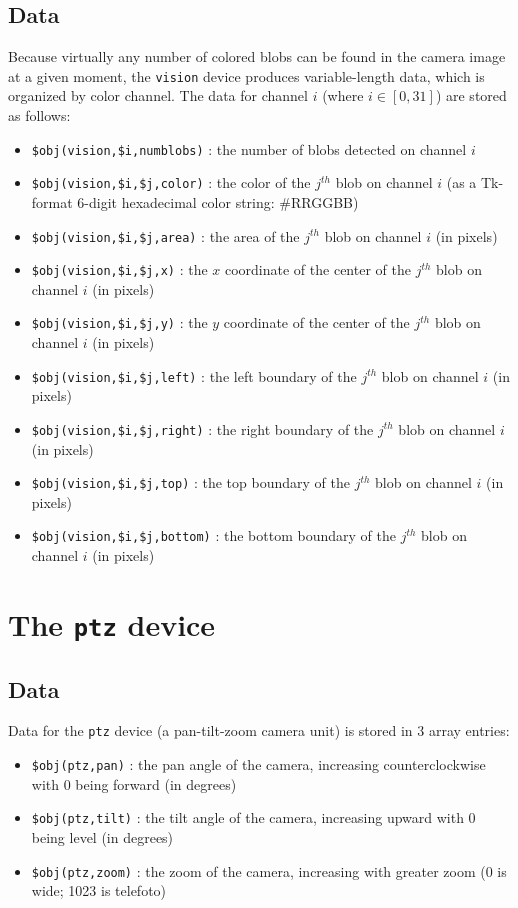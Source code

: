 \documentclass[11pt]{article}
\begin{document}
\subsection{Data}
Because virtually any number of colored blobs can be found in the camera image 
at a given moment, the {\tt vision} device produces variable-length data,
which is organized by color channel.  The data for channel $i$ (where 
$i \in [0,31]$) are stored as follows:
\begin{itemize}
\item {\tt \$obj(vision,\$i,numblobs)} : the number of blobs detected on
channel $i$
\item {\tt \$obj(vision,\$i,\$j,color)} : the color of the $j^{th}$ blob on
channel $i$ (as a Tk-format 6-digit hexadecimal color string: \#RRGGBB)
\item {\tt \$obj(vision,\$i,\$j,area)} : the area of the $j^{th}$ blob on
channel $i$ (in pixels)
\item {\tt \$obj(vision,\$i,\$j,x)} : the $x$ coordinate of the center of the 
$j^{th}$ blob on channel $i$ (in pixels)
\item {\tt \$obj(vision,\$i,\$j,y)} : the $y$ coordinate of the center of the 
$j^{th}$ blob on channel $i$ (in pixels)
\item {\tt \$obj(vision,\$i,\$j,left)} : the left boundary of the $j^{th}$ 
blob on channel $i$ (in pixels)
\item {\tt \$obj(vision,\$i,\$j,right)} : the right boundary of the $j^{th}$ 
blob on channel $i$ (in pixels)
\item {\tt \$obj(vision,\$i,\$j,top)} : the top boundary of the $j^{th}$ 
blob on channel $i$ (in pixels)
\item {\tt \$obj(vision,\$i,\$j,bottom)} : the bottom boundary of the $j^{th}$ 
blob on channel $i$ (in pixels)
\end{itemize}

\section{The {\tt ptz} device}
\subsection{Data}
Data for the {\tt ptz} device (a pan-tilt-zoom camera unit) is stored in 
3 array entries:
\begin{itemize}
\item {\tt \$obj(ptz,pan)} : the pan angle of the camera, increasing
counterclockwise with 0 being forward (in degrees)
\item {\tt \$obj(ptz,tilt)} : the tilt angle of the camera, increasing upward
with 0 being level (in degrees)
\item {\tt \$obj(ptz,zoom)} : the zoom of the camera, increasing with greater
zoom (0 is wide; 1023 is telefoto)
\end{itemize}
\end{document}
